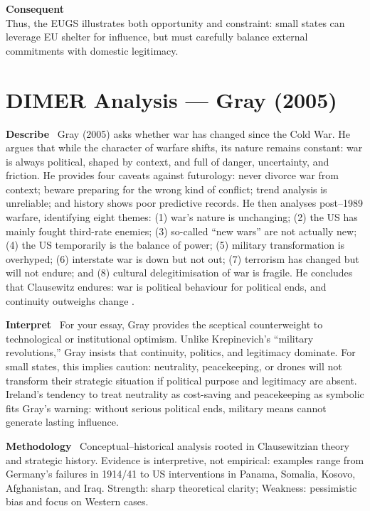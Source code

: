 \textbf{Consequent} \\  
Thus, the EUGS illustrates both opportunity and constraint: small states can leverage EU shelter for influence, but must carefully balance external commitments with domestic legitimacy.  

\section*{DIMER Analysis — Gray (2005)}

\textbf{Describe} \
Gray (2005) asks whether war has changed since the Cold War. He argues that while the character of warfare shifts, its nature remains constant: war is always political, shaped by context, and full of danger, uncertainty, and friction. He provides four caveats against futurology: never divorce war from context; beware preparing for the wrong kind of conflict; trend analysis is unreliable; and history shows poor predictive records. He then analyses post–1989 warfare, identifying eight themes: (1) war’s nature is unchanging; (2) the US has mainly fought third-rate enemies; (3) so-called “new wars” are not actually new; (4) the US temporarily is the balance of power; (5) military transformation is overhyped; (6) interstate war is down but not out; (7) terrorism has changed but will not endure; and (8) cultural delegitimisation of war is fragile. He concludes that Clausewitz endures: war is political behaviour for political ends, and continuity outweighs change \parencite{GRAY_2005}.

\textbf{Interpret} \
For your essay, Gray provides the sceptical counterweight to technological or institutional optimism. Unlike Krepinevich’s “military revolutions,” Gray insists that continuity, politics, and legitimacy dominate. For small states, this implies caution: neutrality, peacekeeping, or drones will not transform their strategic situation if political purpose and legitimacy are absent. Ireland’s tendency to treat neutrality as cost-saving and peacekeeping as symbolic fits Gray’s warning: without serious political ends, military means cannot generate lasting influence.

\textbf{Methodology} \
Conceptual–historical analysis rooted in Clausewitzian theory and strategic history. Evidence is interpretive, not empirical: examples range from Germany’s failures in 1914/41 to US interventions in Panama, Somalia, Kosovo, Afghanistan, and Iraq. Strength: sharp theoretical clarity; Weakness: pessimistic bias and focus on Western cases.

